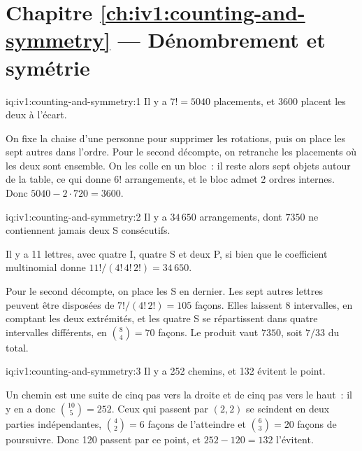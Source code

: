 \section*{Chapitre \ref{ch:iv1:counting-and-symmetry} --- Dénombrement et symétrie}

\begin{solution}{iq:iv1:counting-and-symmetry:1}
Il y a $7! = 5040$ placements, et $3600$ placent les deux à l'écart.

On fixe la chaise d'une personne pour supprimer les rotations, puis on place les sept autres dans l'ordre. Pour le second décompte, on retranche les placements où les deux sont ensemble. On les colle en un bloc~: il reste alors sept objets autour de la table, ce qui donne $6!$ arrangements, et le bloc admet 2 ordres internes. Donc $5040 - 2 \cdot 720 = 3600$.

\end{solution}

\begin{solution}{iq:iv1:counting-and-symmetry:2}
Il y a $34\,650$ arrangements, dont $7350$ ne contiennent jamais deux S consécutifs.

Il y a 11 lettres, avec quatre I, quatre S et deux P, si bien que le coefficient multinomial donne $11!/(4!\,4!\,2!) = 34\,650$.

Pour le second décompte, on place les S en dernier. Les sept autres lettres peuvent être disposées de $7!/(4!\,2!) = 105$ façons. Elles laissent 8 intervalles, en comptant les deux extrémités, et les quatre S se répartissent dans quatre intervalles différents, en $\binom{8}{4} = 70$ façons. Le produit vaut $7350$, soit $7/33$ du total.

\end{solution}

\begin{solution}{iq:iv1:counting-and-symmetry:3}
Il y a 252 chemins, et 132 évitent le point.

Un chemin est une suite de cinq pas vers la droite et de cinq pas vers le haut~: il y en a donc $\binom{10}{5} = 252$. Ceux qui passent par $(2, 2)$ se scindent en deux parties indépendantes, $\binom{4}{2} = 6$ façons de l'atteindre et $\binom{6}{3} = 20$ façons de poursuivre. Donc 120 passent par ce point, et $252 - 120 = 132$ l'évitent.

\end{solution}

